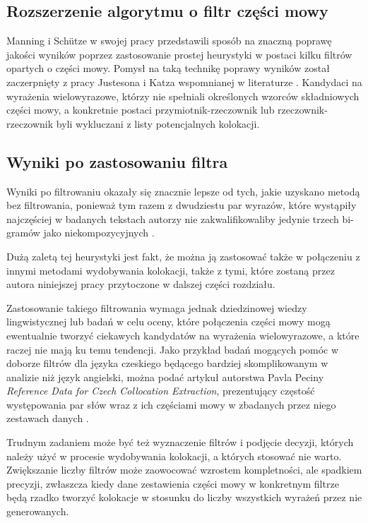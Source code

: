 \subsection{Rozszerzenie algorytmu o filtr części mowy}
Manning i Schütze w swojej pracy przedstawili sposób na znaczną poprawę jakości wyników poprzez zastosowanie prostej heurystyki w postaci kilku filtrów opartych o części mowy.
Pomysł na taką technikę poprawy wyników został zaczerpnięty z pracy Justesona i Katza wspomnianej w literaturze \cite[str. 154]{mit}.
Kandydaci na wyrażenia wielowyrazowe, którzy nie spełniali określonych wzorców składniowych części mowy, a konkretnie postaci przymiotnik-rzeczownik lub rzeczownik-rzeczownik \cite[str. 155]{mit} byli wykluczani z listy potencjalnych kolokacji.


\subsection{Wyniki po zastosowaniu filtra}
Wyniki po filtrowaniu okazały się znacznie lepsze od tych, jakie uzyskano metodą bez filtrowania, ponieważ tym razem z dwudziestu par wyrazów, które wystąpiły najczęściej w badanych tekstach autorzy nie zakwalifikowaliby jedynie trzech bi-gramów jako niekompozycyjnych \cite[str. 155]{mit}.

\par
Dużą zaletą tej heurystyki jest fakt, że można ją zastosować także w połączeniu z innymi metodami wydobywania kolokacji, także z tymi, które zostaną przez autora niniejszej pracy przytoczone w dalszej części rozdziału.

\par
Zastosowanie takiego filtrowania wymaga jednak dziedzinowej wiedzy lingwistycznej lub badań w celu oceny, które połączenia części mowy mogą ewentualnie tworzyć ciekawych kandydatów na wyrażenia wielowyrazowe, a które raczej nie mają ku temu tendencji.
Jako przykład badań mogących pomóc w doborze filtrów dla języka czeskiego będącego bardziej skomplikowanym w analizie niż język angielski, można podać artykuł autorstwa Pavla Peciny \emph{Reference Data for Czech Collocation Extraction}, prezentujący częstość występowania par słów wraz z ich częściami mowy w zbadanych przez niego zestawach danych \cite{pecina_resource}.

\par
Trudnym zadaniem może być też wyznaczenie filtrów i podjęcie decyzji, których należy użyć w procesie wydobywania kolokacji, a których stosować nie warto.
Zwiększanie liczby filtrów może zaowocować wzrostem kompletności, ale spadkiem precyzji, zwłaszcza kiedy dane zestawienia części mowy w konkretnym filtrze będą rzadko tworzyć kolokacje w stosunku do liczby wszystkich wyrażeń przez nie generowanych.


